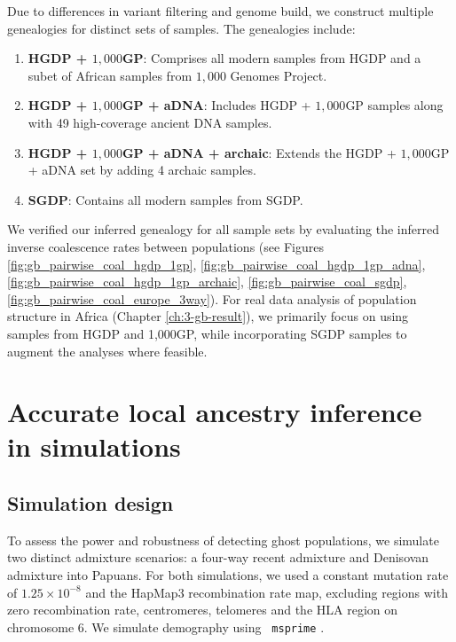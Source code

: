 Due to differences in variant filtering and genome build, we construct multiple genealogies for distinct sets of samples. The genealogies include:  
\begin{enumerate}
    \item \textbf{HGDP + $1{,}000$GP}: Comprises all modern samples from HGDP and a subet of African samples from $1{,}000$ Genomes Project.  
    \item \textbf{HGDP + $1{,}000$GP + aDNA}: Includes HGDP + $1{,}000$GP samples along with 49 high-coverage ancient DNA samples.  
    \item \textbf{HGDP + $1{,}000$GP + aDNA + archaic}: Extends the HGDP + $1{,}000$GP + aDNA set by adding 4 archaic samples.  
    \item \textbf{SGDP}: Contains all modern samples from SGDP.  
\end{enumerate}  
We verified our inferred genealogy for all sample sets by evaluating the inferred inverse coalescence rates between populations (see Figures \ref{fig:gb_pairwise_coal_hgdp_1gp}, \ref{fig:gb_pairwise_coal_hgdp_1gp_adna}, \ref{fig:gb_pairwise_coal_hgdp_1gp_archaic}, \ref{fig:gb_pairwise_coal_sgdp}, \ref{fig:gb_pairwise_coal_europe_3way}). For real data analysis of population structure in Africa (Chapter \ref{ch:3-gb-result}), we primarily focus on using samples from HGDP and 1,000GP, while incorporating SGDP samples to augment the analyses where feasible.

\section{Accurate local ancestry inference in simulations}
\label{sec:ch2-gb-sim}
\subsection{Simulation design}
\label{sec:ch2-gb-sim-design}

To assess the power and robustness of detecting ghost populations, we simulate two distinct admixture scenarios: a four-way recent admixture and Denisovan admixture into Papuans. For both simulations, we used a constant mutation rate of $1.25 \times 10^{-8}$ and the HapMap3 recombination rate map, excluding regions with zero recombination rate, centromeres, telomeres and the HLA region on chromosome 6. We simulate demography using \texttt{ msprime} \cite{kelleher2016efficient}.

